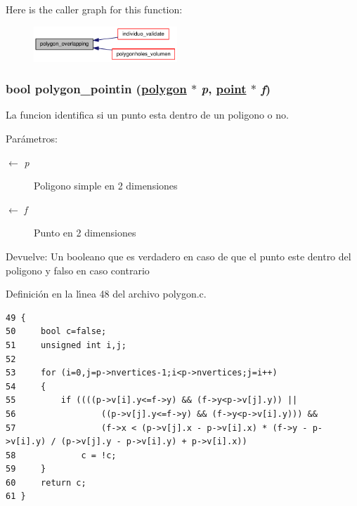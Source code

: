 Here is the caller graph for this function:\begin{figure}[H]
\begin{center}
\leavevmode
\includegraphics[width=153pt]{group__geometry_g2be6101a257ea8896e61e93d14b22b89_g2be6101a257ea8896e61e93d14b22b89_icgraph}
\end{center}
\end{figure}
\hypertarget{group__geometry_geab0a1d6da7c44ae49494958bb885504_geab0a1d6da7c44ae49494958bb885504}{
\subsubsection[polygon\_\-pointin]{\setlength{\rightskip}{0pt plus 5cm}bool polygon\_\-pointin (\hyperlink{struct__polygon}{polygon} $\ast$ {\em p}, \hyperlink{struct__point}{point} $\ast$ {\em f})}}
\label{group__geometry_geab0a1d6da7c44ae49494958bb885504_geab0a1d6da7c44ae49494958bb885504}


La funcion identifica si un punto esta dentro de un poligono o no.

\begin{Desc}
\item[Par\'{a}metros:]
\begin{description}
\item[\mbox{$\leftarrow$} {\em p}]Poligono simple en 2 dimensiones \item[\mbox{$\leftarrow$} {\em f}]Punto en 2 dimensiones \end{description}
\end{Desc}
\begin{Desc}
\item[Devuelve:]Un booleano que es verdadero en caso de que el punto este dentro del poligono y falso en caso contrario \end{Desc}


Definici\'{o}n en la l\'{\i}nea 48 del archivo polygon.c.

\begin{Code}\begin{verbatim}49 {
50     bool c=false;
51     unsigned int i,j;
52 
53     for (i=0,j=p->nvertices-1;i<p->nvertices;j=i++)
54     {
55         if ((((p->v[i].y<=f->y) && (f->y<p->v[j].y)) ||
56                 ((p->v[j].y<=f->y) && (f->y<p->v[i].y))) &&
57                 (f->x < (p->v[j].x - p->v[i].x) * (f->y - p->v[i].y) / (p->v[j].y - p->v[i].y) + p->v[i].x))
58             c = !c;
59     }
60     return c;
61 }
\end{verbatim}\end{Code}





